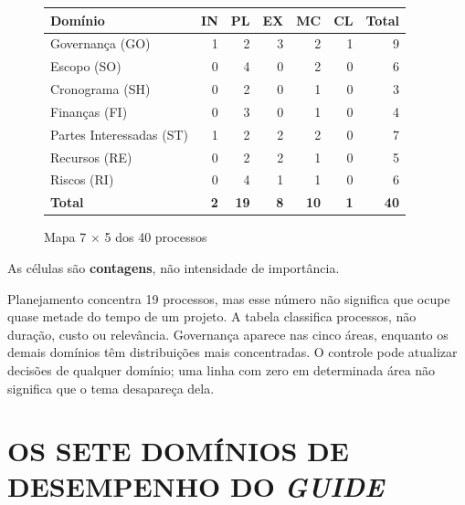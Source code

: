 \documentclass[12pt,a4paper,article,oneside,english,brazil]{abntex2}
\makeatletter
\newcommand{\fontetab}[1]{\par\vspace{3pt}{\small\noindent Fonte: #1\par}}
\newcommand{\refnum}[1]{\csname refnum@#1\endcsname}
\makeatother
\begin{document}
\begin{figure}[!htbp]
\centering
\caption{Mapa 7 \ensuremath{\times} 5 dos 40 processos}\label{fig:2}
\begingroup\SingleSpacing\small
\begin{tabular}{@{}lrrrrrr@{}}
\hline
\textbf{Domínio} & \textbf{IN} & \textbf{PL} & \textbf{EX} & \textbf{MC} & \textbf{CL} & \textbf{Total}\\
\hline
Governança (GO) & \cellcolor{exLine!11}1 & \cellcolor{exLine!22}2 & \cellcolor{exLine!33}3 & \cellcolor{exLine!22}2 & \cellcolor{exLine!11}1 & 9\\
Escopo (SO) & 0 & \cellcolor{exLine!44}4 & 0 & \cellcolor{exLine!22}2 & 0 & 6\\
Cronograma (SH) & 0 & \cellcolor{exLine!22}2 & 0 & \cellcolor{exLine!11}1 & 0 & 3\\
Finanças (FI) & 0 & \cellcolor{exLine!33}3 & 0 & \cellcolor{exLine!11}1 & 0 & 4\\
Partes Interessadas (ST) & \cellcolor{exLine!11}1 & \cellcolor{exLine!22}2 & \cellcolor{exLine!22}2 & \cellcolor{exLine!22}2 & 0 & 7\\
Recursos (RE) & 0 & \cellcolor{exLine!22}2 & \cellcolor{exLine!22}2 & \cellcolor{exLine!11}1 & 0 & 5\\
Riscos (RI) & 0 & \cellcolor{exLine!44}4 & \cellcolor{exLine!11}1 & \cellcolor{exLine!11}1 & 0 & 6\\
\hline
\textbf{Total} & \textbf{2} & \textbf{19} & \textbf{8} & \textbf{10} & \textbf{1} & \textbf{40}\\
\hline
\end{tabular}
\endgroup
\fontetab{[\refnum{pmi}, Guide, Tabela 2-1 e figuras de visão geral dos domínios]; cálculo e apresentação próprios.}
\end{figure}

As células são \textbf{contagens}, não intensidade de importância.

Planejamento concentra 19 processos, mas esse número não significa que ocupe quase metade do tempo de um projeto. A tabela classifica processos, não duração, custo ou relevância. Governança aparece nas cinco áreas, enquanto os demais domínios têm distribuições mais concentradas. O controle pode atualizar decisões de qualquer domínio; uma linha com zero em determinada área não significa que o tema desapareça dela.

\section{OS SETE DOMÍNIOS DE DESEMPENHO DO \textit{GUIDE}}
\end{document}
